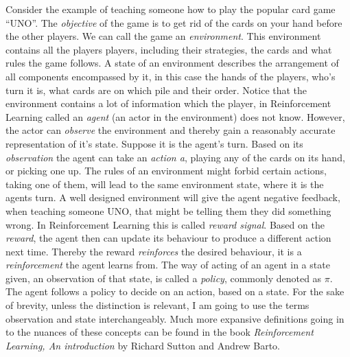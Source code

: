 \noindent
Consider the example of teaching someone how to play the popular card game “UNO”. The \textit{objective} of the game is to get rid of the cards on your hand before the other players. We can call the game an \textit{environment}. This environment contains all the players players, including their strategies, the cards and what rules the game follows. A state of an environment describes the arrangement of all components encompassed by it, in this case the hands of the players, who's turn it is, what cards are on which pile and their order. Notice that the environment contains a lot of information which the player, in Reinforcement Learning called an \textit{agent} (an actor in the environment) does not know. However, the actor can \textit{observe} the environment and thereby gain a reasonably accurate representation of it’s state. Suppose it is the agent's turn. Based on its \textit{observation} the agent can take an \textit{action a}, playing any of the cards on its hand, or picking one up. The rules of an environment might forbid certain actions, taking one of them, will lead to the same environment state, where it is the agents turn. A well designed environment will give the agent negative feedback, when teaching someone UNO, that might be telling them they did something wrong. In Reinforcement Learning this is called \textit{reward signal}. Based on the \textit{reward}, the agent then can update its behaviour to produce a different action next time. Thereby the reward \textit{reinforces} the desired behaviour, it is a \textit{reinforcement} the agent learns from. The way of acting of an agent in a state given, an observation of that state, is called a \textit{policy}, commonly denoted as $\pi$. The agent follows a policy to decide on an action, based on a state.
\newline
For the sake of brevity, unless the distinction is relevant, I am going to use the terms observation and state interchangeably. Much more expansive definitions going in to the nuances of these concepts can be found in the book \textit{Reinforcement Learning, An introduction} by Richard Sutton and Andrew Barto. \cite{sutton_reinforcement_2018}

